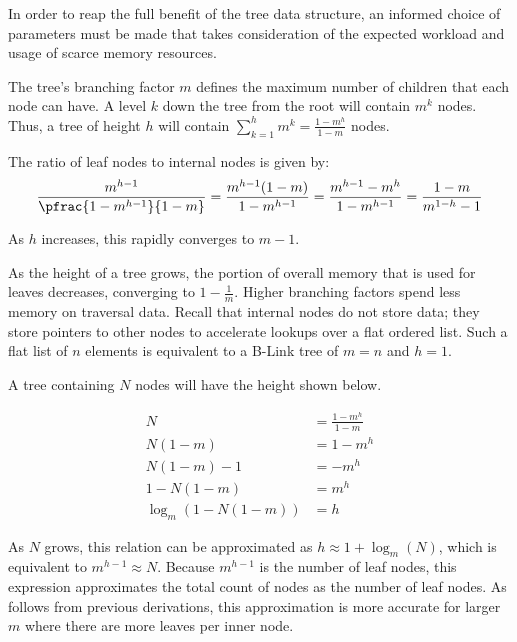 

In order to reap the full benefit of the tree data structure, an informed choice
of parameters must be made that takes consideration of the expected workload and
usage of scarce memory resources.

The tree's branching factor $m$ defines the maximum number of children that each
node can have. A level $k$ down the tree from the root will contain $m^k$ nodes.
Thus, a tree of height $h$ will contain
$\sum_{k=1}^h m^k = \frac{1-m^h}{1-m}$ nodes.

The ratio of leaf nodes to internal nodes is given by:
$$
	\frac{m^{h-1}}{\pfrac{1-m^{h-1}}{1-m}}
	= \frac{m^{h-1}(1-m)}{1-m^{h-1}}
	= \frac{m^{h-1}-m^{h}}{1-m^{h-1}}
	= \frac{1-m}{m^{1-h} - 1}
$$

As $h$ increases, this rapidly converges to $m-1$.

\begin{figure}[H]
	\centering
	
\end{figure}

As the height of a tree grows, the portion of overall memory that is used for
leaves decreases, converging to $1-\frac{1}{m}$. Higher branching factors spend
less memory on traversal data. Recall that internal nodes do not store data;
they store pointers to other nodes to accelerate lookups over a flat ordered
list. Such a flat list of $n$ elements is equivalent to a B-Link tree of $m=n$
and $h=1$.

\begin{figure}[H]
	\centering
	
\end{figure}

A tree containing $N$ nodes will have the height shown below.

\begin{align*}
	N &= \frac{1-m^h}{1-m} \\
	N (1-m) &= 1-m^h \\
	N (1-m) - 1 &= -m^h \\
	1 - N (1-m) &= m^h \\
	\log_m\left(1 - N (1-m)\right) &= h
\end{align*}

As $N$ grows, this relation can be approximated as $h \approx 1 + \log_m(N)$,
which is equivalent to  $m^{h-1} \approx N$. Because $m^{h-1}$ is the number of
leaf nodes, this expression approximates the total count of nodes as the number
of leaf nodes. As follows from previous derivations, this approximation is more
accurate for larger $m$ where there are more leaves per inner node.

